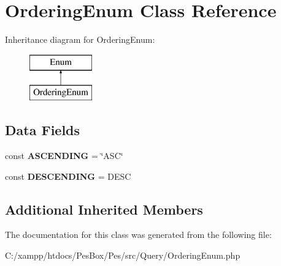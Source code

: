 \hypertarget{class_pes_1_1_query_1_1_ordering_enum}{}\section{Ordering\+Enum Class Reference}
\label{class_pes_1_1_query_1_1_ordering_enum}
Inheritance diagram for Ordering\+Enum\+:\begin{figure}[H]
\begin{center}
\leavevmode
\includegraphics[height=2.000000cm]{class_pes_1_1_query_1_1_ordering_enum}
\end{center}
\end{figure}
\subsection*{Data Fields}
\begin{DoxyCompactItemize}
\item 
\mbox{\label{class_pes_1_1_query_1_1_ordering_enum_a4eb6965f9c46bb5bc363e597470da340}} 
const {\bfseries A\+S\+C\+E\+N\+D\+I\+NG} = \char`\"{}A\+SC\char`\"{}
\item 
\mbox{\label{class_pes_1_1_query_1_1_ordering_enum_ae9122b532d9ebc38e2096506761d13f4}} 
const {\bfseries D\+E\+S\+C\+E\+N\+D\+I\+NG} = \textquotesingle{}D\+E\+SC\textquotesingle{}
\end{DoxyCompactItemize}
\subsection*{Additional Inherited Members}


The documentation for this class was generated from the following file\+:\begin{DoxyCompactItemize}
\item 
C\+:/xampp/htdocs/\+Pes\+Box/\+Pes/src/\+Query/Ordering\+Enum.\+php\end{DoxyCompactItemize}
